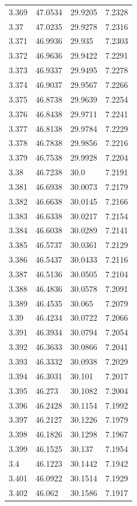 \begin{tabular}{llll}
3.369 & 47.0534 & 29.9205 & 7.2328 \\
3.37 & 47.0235 & 29.9278 & 7.2316 \\
3.371 & 46.9936 & 29.935 & 7.2303 \\
3.372 & 46.9636 & 29.9422 & 7.2291 \\
3.373 & 46.9337 & 29.9495 & 7.2278 \\
3.374 & 46.9037 & 29.9567 & 7.2266 \\
3.375 & 46.8738 & 29.9639 & 7.2254 \\
3.376 & 46.8438 & 29.9711 & 7.2241 \\
3.377 & 46.8138 & 29.9784 & 7.2229 \\
3.378 & 46.7838 & 29.9856 & 7.2216 \\
3.379 & 46.7538 & 29.9928 & 7.2204 \\
3.38 & 46.7238 & 30.0 & 7.2191 \\
3.381 & 46.6938 & 30.0073 & 7.2179 \\
3.382 & 46.6638 & 30.0145 & 7.2166 \\
3.383 & 46.6338 & 30.0217 & 7.2154 \\
3.384 & 46.6038 & 30.0289 & 7.2141 \\
3.385 & 46.5737 & 30.0361 & 7.2129 \\
3.386 & 46.5437 & 30.0433 & 7.2116 \\
3.387 & 46.5136 & 30.0505 & 7.2104 \\
3.388 & 46.4836 & 30.0578 & 7.2091 \\
3.389 & 46.4535 & 30.065 & 7.2079 \\
3.39 & 46.4234 & 30.0722 & 7.2066 \\
3.391 & 46.3934 & 30.0794 & 7.2054 \\
3.392 & 46.3633 & 30.0866 & 7.2041 \\
3.393 & 46.3332 & 30.0938 & 7.2029 \\
3.394 & 46.3031 & 30.101 & 7.2017 \\
3.395 & 46.273 & 30.1082 & 7.2004 \\
3.396 & 46.2428 & 30.1154 & 7.1992 \\
3.397 & 46.2127 & 30.1226 & 7.1979 \\
3.398 & 46.1826 & 30.1298 & 7.1967 \\
3.399 & 46.1525 & 30.137 & 7.1954 \\
3.4 & 46.1223 & 30.1442 & 7.1942 \\
3.401 & 46.0922 & 30.1514 & 7.1929 \\
3.402 & 46.062 & 30.1586 & 7.1917 \\

\end{tabular}
